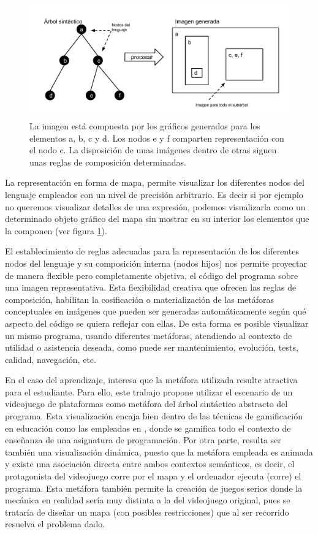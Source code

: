 \documentclass{llncs}
\begin{document}
\begin{figure}[ht]
\begin{center}
\includegraphics[scale=0.5]{images/arbol-mapa.pdf}
\caption{La imagen está compuesta por los gráficos generados para los elementos a, b, c y d. Los nodos e y f comparten representación con el nodo c. La disposición de unas imágenes dentro de otras siguen unas reglas de composición determinadas.
\label{fig:arbolmapa}}
\end{center}
\end{figure}

La representación en forma de mapa, permite visualizar los diferentes nodos del lenguaje empleados con un nivel de precisión arbitrario. Es decir si por ejemplo no queremos visualizar detalles de una expresión, podemos visualizarla como un determinado objeto gráfico del mapa sin mostrar en su interior los elementos que la componen (ver figura \ref{fig:arbolmapa}).

El establecimiento de reglas adecuadas para la representación de los diferentes nodos del lenguaje y su composición interna (nodos hijos) nos permite proyectar de manera flexible pero completamente objetiva, el código del programa sobre una imagen representativa. Esta flexibilidad creativa que ofrecen las reglas de composición, habilitan la cosificación o materialización de las metáforas conceptuales \cite{travers1996programming} en imágenes que pueden ser generadas automáticamente según qué aspecto del código se quiera reflejar con ellas. De esta forma es posible visualizar un mismo programa, usando diferentes metáforas, atendiendo al contexto de utilidad o asistencia deseada, como puede ser mantenimiento, evolución, tests, calidad, navegación, etc.

En el caso del aprendizaje, interesa que la metáfora utilizada resulte atractiva para el estudiante. Para ello, este trabajo propone utilizar el escenario de un videojuego de plataformas como metáfora del árbol sintáctico abstracto del programa. Esta visualización encaja bien dentro de las técnicas de gamificación en educación como las empleadas en \cite{kumar2012gamification}, donde se gamifica todo el contexto de enseñanza de una asignatura de programación. Por otra parte, resulta ser también una visualización dinámica, puesto que la metáfora empleada es animada y existe una asociación directa entre ambos contextos semánticos, es decir, el protagonista del videojuego corre por el mapa y el ordenador ejecuta (corre) el programa. Esta metáfora también permite la creación de juegos serios donde la mecánica en realidad sería muy distinta a la del videojuego original, pues se trataría de diseñar un mapa (con posibles restricciones) que al ser recorrido resuelva el problema dado.
\end{document}
